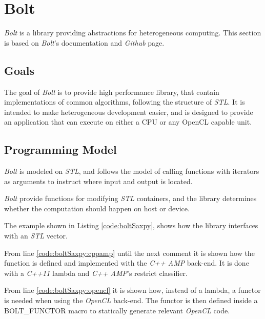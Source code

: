 \section{Bolt} \label{cha:boltRelWorks}
\textit{Bolt} is a library providing abstractions for heterogeneous computing. This section is based on \textit{Bolt}'s documentation\cite{boltDoc} and \textit{Github} page\cite{boltGithub}.

\subsection{Goals}
The goal of \textit{Bolt} is to provide high performance library, that contain implementations of common algorithms, following the structure of \textit{STL}. It is intended to make heterogeneous development easier, and is designed to provide an application that can execute on either a CPU or any OpenCL capable unit.

\subsection{Programming Model}
\textit{Bolt} is modeled on \textit{STL}, and follows the model of calling functions with iterators as arguments to instruct where input and output is located.

\textit{Bolt} provide functions for modifying \textit{STL} containers, and the library determines whether the computation should happen on host or device.

The example shown in Listing \ref{code:boltSaxpy}, shows how the library interfaces with an \textit{STL} vector.

From line \ref{code:boltSaxpy:cppamp} until the next comment it is shown how the function is defined and implemented with the \textit{C++ AMP} back-end. It is done with a \textit{C++11} lambda and \textit{C++ AMP}'s restrict classifier.

From line \ref{code:boltSaxpy:opencl} it is shown how, instead of a lambda, a functor is needed when using the \textit{OpenCL} back-end. The functor is then defined inside a BOLT\_FUNCTOR macro to statically generate relevant \textit{OpenCL} code.

